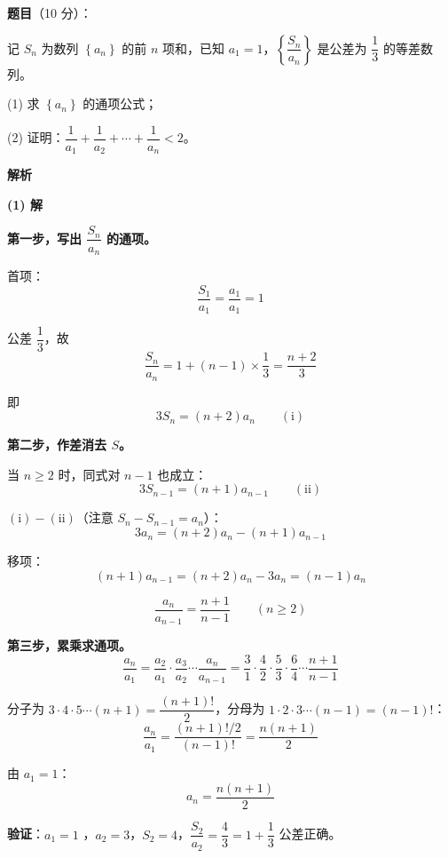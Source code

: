 \begin{answer}

\textbf{题目}（10 分）：

记 $S_n$ 为数列 $\left\{a_n\right\}$ 的前 $n$ 项和，已知 $a_1=1$，$\left\{\dfrac{S_n}{a_n}\right\}$ 是公差为 $\dfrac13$ 的等差数列。

  (1) 求 $\left\{a_n\right\}$ 的通项公式；

  (2) 证明：$\dfrac1{a_1}+\dfrac1{a_2}+\cdots+\dfrac1{a_n}<2$。

\textbf{解析}

\par\medskip

\textbf{(1) 解}

\textbf{第一步，写出 $\dfrac{S_n}{a_n}$ 的通项。}

首项：
\nopagebreak[4]
\[\frac{S_1}{a_1}=\frac{a_1}{a_1}=1\]

公差 $\dfrac13$，故
\nopagebreak[4]
\[\frac{S_n}{a_n}=1+(n-1)\times\frac13=\frac{n+2}3\]

即
\nopagebreak[4]
\[3S_n=(n+2)a_n\qquad(\text{i})\]

\textbf{第二步，作差消去 $S$。}

当 $n\ge2$ 时，同式对 $n-1$ 也成立：
\nopagebreak[4]
\[3S_{n-1}=(n+1)a_{n-1}\qquad(\text{ii})\]

$(\text{i})-(\text{ii})$（注意 $S_n-S_{n-1}=a_n$）：
\nopagebreak[4]
\[3a_n=(n+2)a_n-(n+1)a_{n-1}\]

移项：
\nopagebreak[4]
\[(n+1)a_{n-1}=(n+2)a_n-3a_n=(n-1)a_n\]

\nopagebreak[4]
\[\frac{a_n}{a_{n-1}}=\frac{n+1}{n-1}\qquad(n\ge2)\]

\textbf{第三步，累乘求通项。}
\nopagebreak[4]
\[\frac{a_n}{a_1}=\frac{a_2}{a_1}\cdot\frac{a_3}{a_2}\cdots\frac{a_n}{a_{n-1}}=\frac31\cdot\frac42\cdot\frac53\cdot\frac64\cdots\frac{n+1}{n-1}\]

分子为 $3\cdot4\cdot5\cdots(n+1)=\dfrac{(n+1)!}{2}$，分母为 $1\cdot2\cdot3\cdots(n-1)=(n-1)!$：
\nopagebreak[4]
\[\frac{a_n}{a_1}=\frac{(n+1)!/2}{(n-1)!}=\frac{n(n+1)}2\]

由 $a_1=1$：
\nopagebreak[4]
\[a_n=\frac{n(n+1)}2\]

\textbf{验证}：$a_1=1$ ，$a_2=3$，$S_2=4$，$\dfrac{S_2}{a_2}=\dfrac43=1+\dfrac13$  公差正确。


\end{answer}
